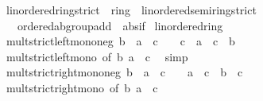 \begin{isabellebody}
\endisatagproof
{\isafoldproof}%
%
\isadelimproof
\isanewline
%
\endisadelimproof
\isanewline
{}\isamarkupfalse%
\isanewline
\isanewline
{}\isamarkupfalse%
\ linordered{\isacharunderscore}{\kern0pt}ring{\isacharunderscore}{\kern0pt}strict\ {\isacharequal}{\kern0pt}\ ring\ {\isacharplus}{\kern0pt}\ linordered{\isacharunderscore}{\kern0pt}semiring{\isacharunderscore}{\kern0pt}strict\isanewline
\ \ {\isacharplus}{\kern0pt}\ ordered{\isacharunderscore}{\kern0pt}ab{\isacharunderscore}{\kern0pt}group{\isacharunderscore}{\kern0pt}add\ {\isacharplus}{\kern0pt}\ abs{\isacharunderscore}{\kern0pt}if\isanewline
{}\isanewline
\isanewline
{}\isamarkupfalse%
\ linordered{\isacharunderscore}{\kern0pt}ring%
\isadelimproof
\ %
\endisadelimproof
%
\isatagproof
\isacommand{{\isachardot}{\kern0pt}{\isachardot}{\kern0pt}}\isamarkupfalse%
%
\endisatagproof
{\isafoldproof}%
%
\isadelimproof
%
\endisadelimproof
\isanewline
\isanewline
{}\isamarkupfalse%
\ mult{\isacharunderscore}{\kern0pt}strict{\isacharunderscore}{\kern0pt}left{\isacharunderscore}{\kern0pt}mono{\isacharunderscore}{\kern0pt}neg{\isacharcolon}{\kern0pt}\ {\isachardoublequoteopen}b\ {\isacharless}{\kern0pt}\ a\ {\isasymLongrightarrow}\ c\ {\isacharless}{\kern0pt}\ {}\ {\isasymLongrightarrow}\ c\ {\isacharasterisk}{\kern0pt}\ a\ {\isacharless}{\kern0pt}\ c\ {\isacharasterisk}{\kern0pt}\ b{\isachardoublequoteclose}\isanewline
%
\isadelimproof
\ \ %
\endisadelimproof
%
\isatagproof
{}\isamarkupfalse%
\ mult{\isacharunderscore}{\kern0pt}strict{\isacharunderscore}{\kern0pt}left{\isacharunderscore}{\kern0pt}mono\ {\isacharbrackleft}{\kern0pt}of\ b\ a\ {\isachardoublequoteopen}{\isacharminus}{\kern0pt}\ c{\isachardoublequoteclose}{\isacharbrackright}{\kern0pt}\ \isamarkupfalse%
\ simp%
\endisatagproof
{\isafoldproof}%
%
\isadelimproof
\isanewline
%
\endisadelimproof
\isanewline
{}\isamarkupfalse%
\ mult{\isacharunderscore}{\kern0pt}strict{\isacharunderscore}{\kern0pt}right{\isacharunderscore}{\kern0pt}mono{\isacharunderscore}{\kern0pt}neg{\isacharcolon}{\kern0pt}\ {\isachardoublequoteopen}b\ {\isacharless}{\kern0pt}\ a\ {\isasymLongrightarrow}\ c\ {\isacharless}{\kern0pt}\ {}\ {\isasymLongrightarrow}\ a\ {\isacharasterisk}{\kern0pt}\ c\ {\isacharless}{\kern0pt}\ b\ {\isacharasterisk}{\kern0pt}\ c{\isachardoublequoteclose}\isanewline
%
\isadelimproof
\ \ %
\endisadelimproof
%
\isatagproof
{}\isamarkupfalse%
\ mult{\isacharunderscore}{\kern0pt}strict{\isacharunderscore}{\kern0pt}right{\isacharunderscore}{\kern0pt}mono\ {\isacharbrackleft}{\kern0pt}of\ b\ a\ {\isachardoublequoteopen}{\isacharminus}{\kern0pt}\ c{\isachardoublequoteclose}{\isacharbrackright}{\kern0pt}\ \isamarkupfalse%

\end{isabellebody}
